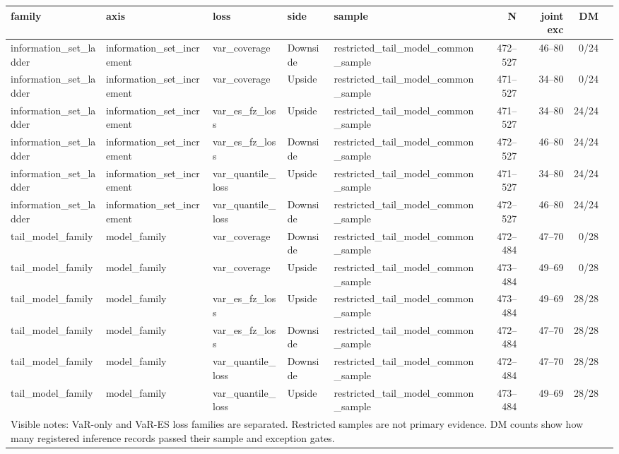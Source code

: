 \begin{tabular}{lllllrrrr}
\toprule
family & axis & loss & side & sample & N & joint exc & DM \\
\midrule
information\_set\_ladder & information\_set\_increment & var\_coverage & Downside & restricted\_tail\_model\_common\_sample & 472--527 & 46--80 & 0/24 \\
information\_set\_ladder & information\_set\_increment & var\_coverage & Upside & restricted\_tail\_model\_common\_sample & 471--527 & 34--80 & 0/24 \\
information\_set\_ladder & information\_set\_increment & var\_es\_fz\_loss & Upside & restricted\_tail\_model\_common\_sample & 471--527 & 34--80 & 24/24 \\
information\_set\_ladder & information\_set\_increment & var\_es\_fz\_loss & Downside & restricted\_tail\_model\_common\_sample & 472--527 & 46--80 & 24/24 \\
information\_set\_ladder & information\_set\_increment & var\_quantile\_loss & Upside & restricted\_tail\_model\_common\_sample & 471--527 & 34--80 & 24/24 \\
information\_set\_ladder & information\_set\_increment & var\_quantile\_loss & Downside & restricted\_tail\_model\_common\_sample & 472--527 & 46--80 & 24/24 \\
tail\_model\_family & model\_family & var\_coverage & Downside & restricted\_tail\_model\_common\_sample & 472--484 & 47--70 & 0/28 \\
tail\_model\_family & model\_family & var\_coverage & Upside & restricted\_tail\_model\_common\_sample & 473--484 & 49--69 & 0/28 \\
tail\_model\_family & model\_family & var\_es\_fz\_loss & Upside & restricted\_tail\_model\_common\_sample & 473--484 & 49--69 & 28/28 \\
tail\_model\_family & model\_family & var\_es\_fz\_loss & Downside & restricted\_tail\_model\_common\_sample & 472--484 & 47--70 & 28/28 \\
tail\_model\_family & model\_family & var\_quantile\_loss & Downside & restricted\_tail\_model\_common\_sample & 472--484 & 47--70 & 28/28 \\
tail\_model\_family & model\_family & var\_quantile\_loss & Upside & restricted\_tail\_model\_common\_sample & 473--484 & 49--69 & 28/28 \\
\midrule
\multicolumn{8}{l}{\footnotesize Visible notes: VaR-only and VaR-ES loss families are separated. Restricted samples are not primary evidence. DM counts show how many registered inference records passed their sample and exception gates.} \\
\bottomrule
\end{tabular}
